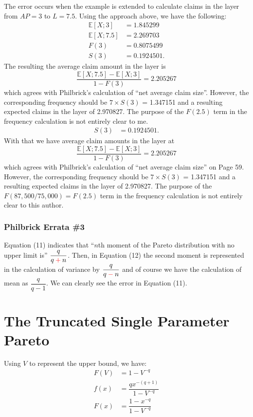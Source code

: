 \documentclass[]{article} %
\begin{document}
The error occurs when the example is extended to calculate claims in the layer from $AP = 3$ to $L = 7.5$. Using the approach above, we have the following:
\begin{align}
\mathbb{E}[X;3] &= 1.845299\nonumber\\
\mathbb{E}[X;7.5] &= 2.269703\nonumber\\
F(3) &= 0.8075499\nonumber\\
S(3) &= 0.1924501.\nonumber
\end{align}
The resulting the average claim amount in the layer is 
\begin{equation}
\frac{\mathbb{E}[X;7.5] - \mathbb{E}[X;3]}{1 - F(3)} = 2.205267 \nonumber
\end{equation}
which agrees with Philbrick's calculation of ``net average claim size''. However, the corresponding frequency should be $ 7 \times S(3)$ = 1.347151 and a resulting expected claims in the layer of 2.970827. The purpose of the $F(2.5)$ term in the frequency calculation is not entirely clear to me. 
\begin{align}
S(3) &= 0.1924501\nonumber.
\end{align}
With that we have average claim amounts in the layer at 
\begin{equation}
\frac{\mathbb{E}[X;7.5] - \mathbb{E}[X;3]}{1 - F(3)} = 2.205267 \nonumber
\end{equation}
which agrees with Philbrick's calculation of ``net average claim size'' on Page 59. However, the corresponding frequency should be $ 7 \times S(3)$ = 1.347151 and a resulting expected claims in the layer of 2.970827. The purpose of the $F(87,500/75,000) = F(2.5)$ term in the frequency calculation is not entirely clear to this author. 

\subsubsection{Philbrick Errata \#3}
Equation (11) indicates that ``$n$th moment of the Pareto distribution with no upper limit is'' $\dfrac{q}{q \color{red}+\color{black} n}$. Then, in Equation (12) the second moment is represented in the calculation of variance by $\dfrac{q}{q \color{red}-\color{black} n}$ and of course we have the calculation of mean as $\dfrac{q}{q - 1}$. We can clearly see the error in Equation (11).



\section{The Truncated Single Parameter Pareto}\label{sec:TSPP}
Using $V$ to represent the upper bound, we have:
\begin{align}
F(V) & = 1 - V^{-q}\\
f(x) & =  \dfrac{qx^{-(q+1)}}{1 - V^{-q}}\label{ISPPf}\\
F(x) & =  \dfrac{1 - x^{-q}}{1 - V^{-q}}\label{ISPPF}
\end{align}
\end{document}
